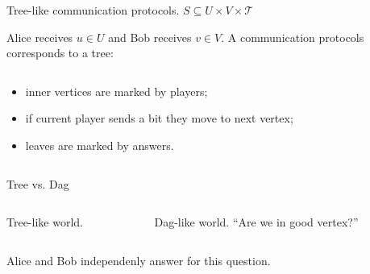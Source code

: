 \begin{frame}{Tree-like communication protocols. $S \subseteq U \times V \times \mathcal{T}$}

    Alice receives $u \in U$ and Bob receives $v \in V$. A communication protocols corresponds to a tree:

    \begin{columns}[t]
		\begin{column}{0.6\textwidth}
            \begin{itemize}
                \item<2-> inner vertices are marked by players;
	            \item<3-> if current player sends a bit they move to next vertex;
    		    \item<8-> leaves are marked by answers.
	        \end{itemize}

            \vspace{0.5cm}
        \end{column}
        
		\begin{column}{0.3\textwidth}
            
		\end{column}
	\end{columns}

\end{frame}


\begin{frame}{Tree vs. Dag}

	\begin{columns}[t]
		\begin{column}{0.52\textwidth}
            \begin{center}
                Tree-like world.
                \vspace{0.2cm}
                
            \end{center}
        \end{column}

        \pause
		\begin{column}{0.48\textwidth}
            \begin{center}
                Dag-like world. ``Are we in good vertex?''
                \vspace{0.2cm}
                
            \end{center}
		\end{column}
	\end{columns}

    \pause
    \pause
    \vspace{0.4cm}
    Alice and Bob independenly answer for this question.
\end{frame}


